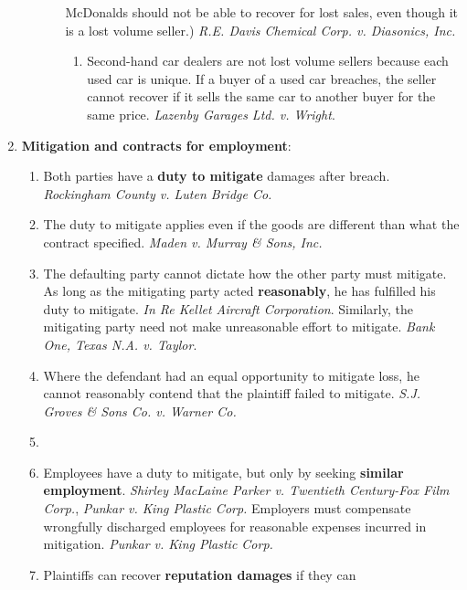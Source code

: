 \begin{enumerate}
\begin{enumerate}
\begin{enumerate}
            McDonalds should not be able to recover for lost sales, even 
            though it is a lost volume seller.) \emph{R.E. Davis Chemical Corp. 
            v. Diasonics, Inc.}
            \begin{enumerate}
                \item Second-hand car dealers are not lost volume sellers 
                because each used car is unique. If a buyer of a used car 
                breaches, the seller cannot recover if it sells the same car 
                to another buyer for the same price. \emph{Lazenby Garages 
                Ltd. v. Wright}.
            \end{enumerate}
        \end{enumerate}
    \end{enumerate}
    \item \textbf{Mitigation and contracts for employment}:
    \begin{enumerate}
        \item Both parties have a \textbf{duty to mitigate} damages after 
        breach. \emph{Rockingham County v. Luten Bridge Co.}
        \item The duty to mitigate applies even if the goods are different 
        than what the contract specified. \emph{Maden v. Murray \& Sons, Inc.}
        \item The defaulting party cannot dictate how the other party must 
        mitigate. As long as the mitigating party acted \textbf{reasonably}, 
        he has fulfilled his duty to mitigate. \emph{In Re Kellet Aircraft 
        Corporation}. Similarly, the mitigating party need not make 
        unreasonable effort to mitigate. \emph{Bank One, Texas N.A. v.  Taylor}.
        \item Where the defendant had an equal opportunity to mitigate loss, 
        he cannot reasonably contend that the plaintiff failed to mitigate. 
        \emph{S.J. Groves \& Sons Co. v. Warner Co.}
        \item %
        \item Employees have a duty to mitigate, but only by seeking 
        \textbf{similar employment}. \emph{Shirley MacLaine Parker v.  
        Twentieth Century-Fox Film Corp.}, \emph{Punkar v. King Plastic 
        Corp.} Employers must compensate wrongfully discharged employees for 
        reasonable expenses incurred in mitigation. \emph{Punkar v. King 
        Plastic Corp.}
        \item Plaintiffs can recover \textbf{reputation damages} if they can 

\end{enumerate}
\end{enumerate}
